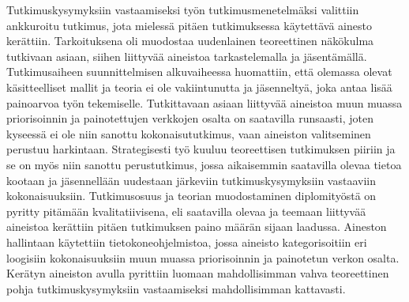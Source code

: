 Tutkimuskysymyksiin vastaamiseksi työn tutkimusmenetelmäksi valittiin ankkuroitu tutkimus, jota mielessä pitäen tutkimuksessa käytettävä ainesto kerättiin.
Tarkoituksena oli muodostaa uudenlainen teoreettinen näkökulma tutkivaan asiaan, siihen liittyvää aineistoa tarkastelemalla ja jäsentämällä.
Tutkimusaiheen suunnittelmisen alkuvaiheessa huomattiin, että olemassa olevat käsitteelliset mallit ja teoria ei ole vakiintunutta ja jäsenneltyä, joka antaa lisää painoarvoa työn tekemiselle.
Tutkittavaan asiaan liittyvää aineistoa muun muassa priorisoinnin ja painotettujen verkkojen osalta on saatavilla runsaasti, joten kyseessä ei ole niin sanottu kokonaisututkimus, vaan aineiston valitseminen perustuu harkintaan.
Strategisesti työ kuuluu teoreettisen tutkimuksen piiriin ja se on myös niin sanottu perustutkimus, jossa aikaisemmin saatavilla olevaa tietoa kootaan ja jäsennellään uudestaan järkeviin tutkimuskysymyksiin vastaaviin kokonaisuuksiin.
Tutkimusosuus ja teorian muodostaminen diplomityöstä on pyritty pitämään kvalitatiivisena, eli saatavilla olevaa ja teemaan liittyvää aineistoa kerättiin pitäen tutkimuksen paino määrän sijaan laadussa.
Aineston hallintaan käytettiin tietokoneohjelmistoa, jossa aineisto kategorisoitiin eri loogisiin kokonaisuuksiin muun muassa priorisoinnin ja painotetun verkon osalta.
Kerätyn aineiston avulla pyrittiin luomaan mahdollisimman vahva teoreettinen pohja tutkimuskysymyksiin vastaamiseksi mahdollisimman kattavasti.